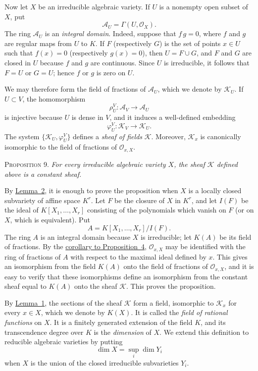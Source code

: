 Now let $X$ be an irreducible algebraic variety. If $U$ is a nonempty open subset of $X$, put
\[
\mathcal{A}_U=\Gamma(U,\mathcal{O}_X).
\]
The ring $\mathcal{A}_U$ is an \textit{integral domain}. Indeed, suppose that $f\,g=0$, where $f$ and $g$ are regular maps from $U$ to $K$. If $F$ (respectively $G$) is the set of points $x\in U$ such that $f(x)=0$ (respectively $g(x)=0$), then $U=F\cup G$, and $F$ and $G$ are closed in $U$ because $f$ and $g$ are continuous. Since $U$ is irreducible, it follows that $F=U$ or $G=U$; hence $f$ or $g$ is zero on $U$.

We may therefore form the field of fractions of $\mathcal{A}_U$, which we denote by $\mathcal{K}_U$. If $U\subset V$, the homomorphism
\[
\rho_U^V:\mathcal{A}_V\longrightarrow\mathcal{A}_U
\]
is injective because $U$ is dense in $V$, and it induces a well-defined embedding
\[
\varphi_U^V:\mathcal{K}_V\longrightarrow\mathcal{K}_U.
\]
The system $\{\mathcal{K}_U,\varphi_U^V\}$ defines a \textit{sheaf of fields} $\mathcal{K}$. Moreover, $\mathcal{K}_x$ is canonically isomorphic to the field of fractions of $\mathcal{O}_{x,X}$.

\label{fac:II:1:no:36:prop:9}
\textsc{Proposition 9.} \textit{For every irreducible algebraic variety $X$, the sheaf $\mathcal{K}$ defined above is a constant sheaf.}

By \hyperref[fac:II:1:no:36:lemma:2]{Lemma~2}, it is enough to prove the proposition when $X$ is a locally closed subvariety of affine space $K^r$. Let $F$ be the closure of $X$ in $K^r$, and let $I(F)$ be the ideal of $K[X_1,\ldots,X_r]$ consisting of the polynomials which vanish on $F$ (or on $X$, which is equivalent). Put
\[
A=K[X_1,\ldots,X_r]/I(F).
\]
The ring $A$ is an integral domain because $X$ is irreducible; let $K(A)$ be its field of fractions. By the \hyperref[fac:II:1:no:31:cor:prop:4]{corollary to Proposition~4}, $\mathcal{O}_{x,X}$ may be identified with the ring of fractions of $A$ with respect to the maximal ideal defined by $x$. This gives an isomorphism from the field $K(A)$ onto the field of fractions of $\mathcal{O}_{x,X}$, and it is easy to verify that these isomorphisms define an isomorphism from the constant sheaf equal to $K(A)$ onto the sheaf $\mathcal{K}$. This proves the proposition.

By \hyperref[fac:II:1:no:36:lemma:1]{Lemma~1}, the sections of the sheaf $\mathcal{K}$ form a field, isomorphic to $\mathcal{K}_x$ for every $x\in X$, which we denote by $K(X)$. It is called the \textit{field of rational functions} on $X$. It is a finitely generated extension of the field $K$, and its transcendence degree over $K$ is the \textit{dimension} of $X$. We extend this definition to reducible algebraic varieties by putting
\[
\dim X=\sup_i\dim Y_i
\]
when $X$ is the union of the closed irreducible subvarieties $Y_i$.

